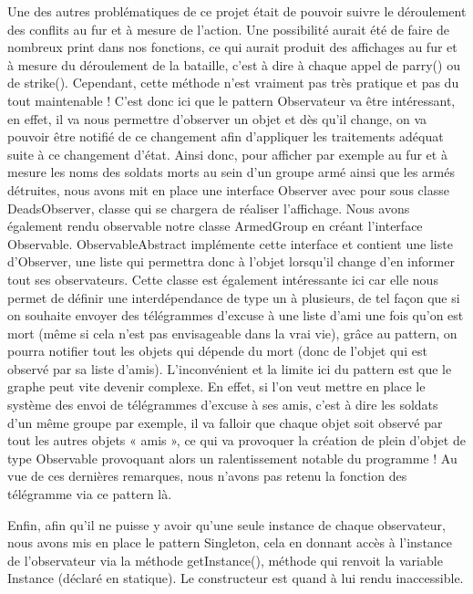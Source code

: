 Une des autres problématiques de ce projet était de pouvoir suivre le déroulement des conflits au fur et à mesure de l’action. Une possibilité aurait été de faire de nombreux print dans nos fonctions, ce qui aurait produit des affichages au fur et à mesure du déroulement de la bataille, c'est à dire à chaque appel de parry() ou de strike(). Cependant, cette méthode n'est vraiment pas très pratique et pas du tout maintenable ! 
C'est donc ici que le pattern Observateur va être intéressant, en effet, il va nous permettre d'observer un objet et dès qu'il change, on va pouvoir être notifié de ce changement afin d'appliquer les traitements adéquat suite à ce changement d'état. 
Ainsi donc, pour afficher par exemple au fur et à mesure les noms des soldats morts au sein d'un groupe armé ainsi que les armés détruites, nous avons mit en place une interface Observer avec pour sous classe DeadsObserver, classe qui se chargera de réaliser l'affichage. Nous avons également rendu observable notre classe ArmedGroup en créant l'interface Observable. ObservableAbstract implémente cette interface et contient une liste d'Observer, une liste qui permettra donc à l'objet lorsqu'il change d'en informer tout ses observateurs. 
Cette classe est également intéressante ici car elle nous permet de définir une interdépendance de type un à plusieurs, de tel façon que si on souhaite envoyer des télégrammes d’excuse à une liste d'ami une fois qu'on est mort (même si cela n'est pas envisageable dans la vrai vie), grâce au pattern, on pourra notifier tout les objets qui dépende du mort (donc de l'objet qui est observé par sa liste d'amis). L'inconvénient et la limite ici du pattern est que le graphe peut vite devenir complexe. En effet, si l'on veut mettre en place le système des envoi de télégrammes d’excuse à ses amis, c'est à dire les soldats d'un même groupe par exemple, il va falloir que chaque objet soit observé par tout les autres objets « amis », ce qui va provoquer la création de plein d'objet de type Observable provoquant alors un ralentissement notable du programme ! Au vue de ces dernières remarques, nous n'avons pas retenu la fonction des télégramme via ce pattern là.



Enfin, afin qu’il ne puisse y avoir qu'une seule instance de chaque observateur, nous avons mis en place le pattern Singleton, cela en donnant accès à l'instance de l'observateur via la méthode getInstance(), méthode qui renvoit la variable Instance  (déclaré en statique). Le constructeur est quand à lui rendu inaccessible.



